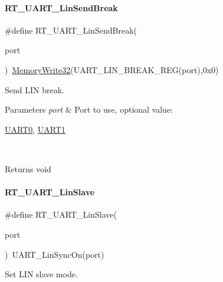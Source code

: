 \paragraph{\texorpdfstring{R\+T\+\_\+\+U\+A\+R\+T\+\_\+\+Lin\+Send\+Break}{RT\_UART\_LinSendBreak}}
{\footnotesize\ttfamily \#define R\+T\+\_\+\+U\+A\+R\+T\+\_\+\+Lin\+Send\+Break(\begin{DoxyParamCaption}\item[{}]{port }\end{DoxyParamCaption})~\mbox{\hyperlink{a00026_a6b9732365b12e48ddb89fe1028b975b0}{Memory\+Write32}}(U\+A\+R\+T\+\_\+\+L\+I\+N\+\_\+\+B\+R\+E\+A\+K\+\_\+\+R\+EG(port),0x0)}



Send L\+IN break. 


\begin{DoxyParams}{Parameters}
{\em port} & Port to use, optional value\+:
\begin{DoxyCode}
\mbox{\hyperlink{a00098_a0508661f121639ffdee7de2353a0def2}{UART0}}, \mbox{\hyperlink{a00098_a8d69bf04d07af4fbbab5a8bd291f65ff}{UART1}}
\end{DoxyCode}
 \\
\hline
\end{DoxyParams}
\begin{DoxyReturn}{Returns}
void 
\end{DoxyReturn}
\mbox{\label{a00098_a3f9518fa74ec401803fe1d15e0d39ff2}} 
\paragraph{\texorpdfstring{R\+T\+\_\+\+U\+A\+R\+T\+\_\+\+Lin\+Slave}{RT\_UART\_LinSlave}}
{\footnotesize\ttfamily \#define R\+T\+\_\+\+U\+A\+R\+T\+\_\+\+Lin\+Slave(\begin{DoxyParamCaption}\item[{}]{port }\end{DoxyParamCaption})~U\+A\+R\+T\+\_\+\+Lin\+Sync\+On(port)}



Set L\+IN slave mode. 


